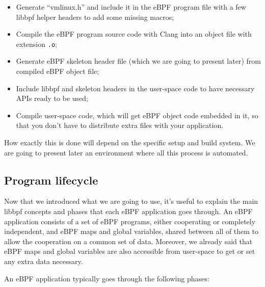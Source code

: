 \begin{itemize}
	\item 
		Generate ``vmlinux.h'' and include it in the eBPF program file with a few libbpf helper headers to add some missing macros; 
	\item 
		Compile the eBPF program source code with Clang into an object file with extension \colorbox{backcolour}{\lstinline[style=highlight, language=bash]|.o|};
	\item 
		Generate eBPF skeleton header file (which we are going to present later) from compiled eBPF object file;
	\item 
		Include libbpf and skeleton headers in the user-space code to have necessary APIs ready to be used;
	\item 
		Compile user-space code, which will get eBPF object code embedded in it, so that you don’t have to distribute extra files with your application.
\end{itemize}

How exactly this is done will depend on the specific setup and build system.
We are going to present later an environment where all this process is automated.

\subsection{Program lifecycle}

Now that we introduced what we are going to use, it’s useful to explain the main libbpf concepts and phases that each eBPF application goes through. 
An eBPF application consists of a set of eBPF programs, either cooperating or completely independent, and eBPF maps and global variables, shared between all of them to allow the cooperation on a common set of data. 
Moreover, we already said that eBPF maps and global variables are also accessible from user-space to get or set any extra data necessary. 

An eBPF application typically goes through the following phases:

